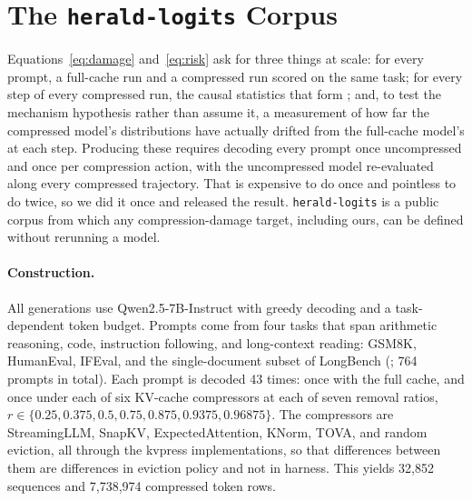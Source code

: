 \section{The \texttt{herald-logits} Corpus}
\label{sec:corpus}

Equations~\ref{eq:damage} and~\ref{eq:risk} ask for three things at scale:
for every prompt, a full-cache run and a compressed run scored on the same
task; for every step of every compressed run, the causal statistics that
form \info; and, to test the mechanism hypothesis rather than assume it, a
measurement of how far the compressed model's distributions have actually
drifted from the full-cache model's at each step. Producing these requires
decoding every prompt once uncompressed and once per compression action,
with the uncompressed model re-evaluated along every compressed trajectory.
That is expensive to do once and pointless to do twice, so we did it once and
released the result. \texttt{herald-logits} is a public corpus from which any
compression-damage target, including ours, can be defined without rerunning a
model.

\paragraph{Construction.}
All generations use Qwen2.5-7B-Instruct with greedy decoding and a
task-dependent token budget. Prompts come from four tasks that span
arithmetic reasoning, code, instruction following, and long-context reading:
GSM8K, HumanEval, IFEval, and the single-document subset of LongBench
(; 764 prompts in total). Each prompt is decoded
43 times: once with the full cache, and once under each of six KV-cache
compressors at each of seven removal ratios,
$r \in \{0.25, 0.375, 0.5, 0.75, 0.875, 0.9375, 0.96875\}$. The compressors
are StreamingLLM, SnapKV, ExpectedAttention, KNorm, TOVA, and random
eviction, all through the kvpress implementations, so that differences
between them are differences in eviction policy and not in harness. This
yields 32{,}852 sequences and 7{,}738{,}974 compressed token rows.

